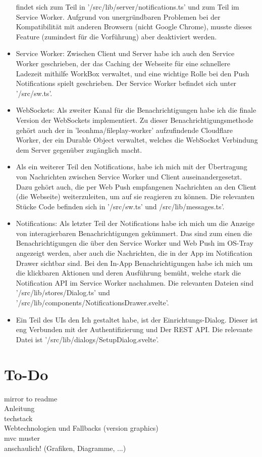 \documentclass[a4paper]{article}
\begin{document}
\begin{itemize}
        findet sich zum Teil in '/src/lib/server/notifications.ts' und zum Teil
        im Service Worker. Aufgrund von unergründbaren Problemen bei der
        Kompatibilität mit anderen Browsern (nicht Google Chrome), musste dieses
        Feature (zumindest für die Vorführung) aber deaktiviert werden.
  \item Service Worker: Zwischen Client und Server habe ich auch den Service
        Worker geschrieben, der das Caching der Webseite für eine schnellere
        Ladezeit mithilfe WorkBox verwaltet, und eine wichtige Rolle bei den
        Push Notifications spielt geschrieben. Der Service Worker befindet sich
        unter '/src/sw.ts'.
  \item WebSockets: Als zweiter Kanal für die Benachrichtigungen habe ich die
        finale Version der WebSockets implementiert. Zu dieser
        Benachrichtigungsmethode gehört auch der in 'leonhma/fileplay-worker'
        aufzufindende Cloudflare Worker, der ein Durable Object verwaltet,
        welches die WebSocket Verbindung dem Server gegenüber zugänglich macht.
  \item Als ein weiterer Teil den Notifications, habe ich mich mit der
        Übertragung von Nachrichten zwischen Service Worker und Client
        auseinandergesetzt. Dazu gehört auch, die per Web Push empfangenen
        Nachrichten an den Client (die Webseite) weiterzuleiten, um auf sie
        reagieren zu können. Die relevanten Stücke Code befinden sich in
        '/src/sw.ts' und /src/lib/messages.ts'.
  \item Notifications: Als letzter Teil der Notifications habe ich mich um die
        Anzeige von interagierbaren Benachrichtigungen gekümmert. Das sind zum
        einen die Benachrichtigungen die über den Service Worker und Web Push im
        OS-Tray angezeigt werden, aber auch die Nachrichten, die in der App im
        Notification Drawer sichtbar sind. Bei den In-App Benachrichtigungen
        habe ich mich um die klickbaren Aktionen und deren Ausführung bemüht,
        welche stark die Notification API im Service Worker nachahmen. Die
        relevanten Dateien sind '/src/lib/stores/Dialog.ts' und
        '/src/lib/components/NotificationsDrawer.svelte'.
  \item Ein Teil des UIs den Ich gestaltet habe, ist der Einrichtungs-Dialog.
        Dieser ist eng Verbunden mit der Authentifizierung und Der REST API. Die
        relevante Datei ist '/src/lib/dialogs/SetupDialog.svelte'.
\end{itemize}



\section{To-Do}
mirror to readme\\
Anleitung\\
techstack\\
Webtechnologien und Fallbacks (version graphics)\\
mvc muster\\
anschaulich! (Grafiken, Diagramme, ...)
\end{document}
